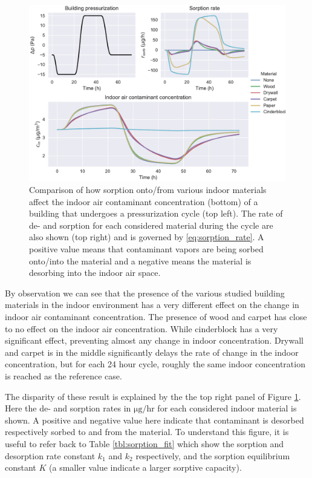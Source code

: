 \begin{figure}[!htb]
  \includegraphics[width=\textwidth]{sorption_indoor_cycle.pdf}
  \caption{
  Comparison of how sorption onto/from various indoor materials affect the indoor air contaminant concentration (bottom) of a building that undergoes a pressurization cycle (top left). The rate of de- and sorption for each considered material during the cycle are also shown (top right) and is governed by \eqref{eq:sorption_rate}. A positive value means that contaminant vapors are being sorbed onto/into the material and a negative means the material is desorbing into the indoor air space.}
  \label{fig:indoor_sorption_cycle}
\end{figure}

By observation we can see that the presence of the various studied building materials in the indoor environment has a very different effect on the change in indoor air contaminant concentration.
The presence of wood and carpet has close to no effect on the indoor air concentration.
While cinderblock has a very significant effect, preventing almost any change in indoor concentration.
Drywall and carpet is in the middle significantly delays the rate of change in the indoor concentration, but for each 24 hour cycle, roughly the same indoor concentration is reached as the reference case.\par

The disparity of these result is explained by the the top right panel of Figure \ref{fig:indoor_sorption_cycle}.
Here the de- and sorption rates in $\mathrm{\mu g/hr}$ for each considered indoor material is shown.
A positive and negative value here indicate that contaminant is desorbed respectively sorbed to and from the material.
To understand this figure, it is useful to refer back to Table \ref{tbl:sorption_fit} which show the sorption and desorption rate constant $k_1$ and $k_2$ respectively, and the sorption equilibrium constant $K$ (a smaller value indicate a larger sorptive capacity).\par

